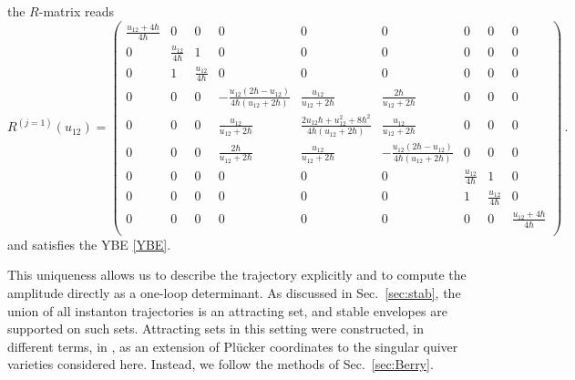 \documentclass[10pt]{article}
\theoremstyle{definition}
\numberwithin{equation}{section}
\begin{document}
the $R$-matrix reads
\begin{equation}
	R^{(j=1)}(u_{12})=
	\begin{pmatrix}
		\frac{u_{12}+4 \hbar }{4 \hbar } & 0 & 0 & 0 & 0 & 0 & 0 & 0 & 0 \\
		0 & \frac{u_{12}}{4 \hbar } & 1 & 0 & 0 & 0 & 0 & 0 & 0 \\
		0 & 1 & \frac{u_{12}}{4 \hbar } & 0 & 0 & 0 & 0 & 0 & 0 \\
		0 & 0 & 0 & -\frac{u_{12} \left(2 \hbar -u_{12}\right)}{4 \hbar  \left(u_{12}+2 \hbar \right)} & \frac{u_{12}}{u_{12}+2 \hbar } & \frac{2 \hbar }{u_{12}+2 \hbar } & 0 & 0 & 0 \\
		0 & 0 & 0 & \frac{u_{12}}{u_{12}+2 \hbar } & \frac{2 u_{12} \hbar +u_{12}^2+8 \hbar ^2}{4 \hbar  \left(u_{12}+2 \hbar \right)} & \frac{u_{12}}{u_{12}+2 \hbar } & 0 & 0 & 0 \\
		0 & 0 & 0 & \frac{2 \hbar }{u_{12}+2 \hbar } & \frac{u_{12}}{u_{12}+2 \hbar } & -\frac{u_{12} \left(2 \hbar -u_{12}\right)}{4 \hbar  \left(u_{12}+2 \hbar \right)} & 0 & 0 & 0 \\
		0 & 0 & 0 & 0 & 0 & 0 & \frac{u_{12}}{4 \hbar } & 1 & 0 \\
		0 & 0 & 0 & 0 & 0 & 0 & 1 & \frac{u_{12}}{4 \hbar } & 0 \\
		0 & 0 & 0 & 0 & 0 & 0 & 0 & 0 & \frac{u_{12}+4 \hbar }{4 \hbar } \\
	\end{pmatrix}\,.
\end{equation}
and satisfies the YBE \eqref{YBE}.

This uniqueness allows us to describe the trajectory explicitly and to compute the amplitude directly as a one-loop determinant.
As discussed in Sec.~\ref{sec:stab}, the union of all instanton trajectories is an attracting set, and stable envelopes are supported on such sets.
Attracting sets in this setting were constructed, in different terms, in \cite{Bykov:2019cst}, as an extension of Pl\"ucker coordinates to the singular quiver varieties considered here.
Instead, we follow the methods of Sec.~\ref{sec:Berry}.
\end{document}
